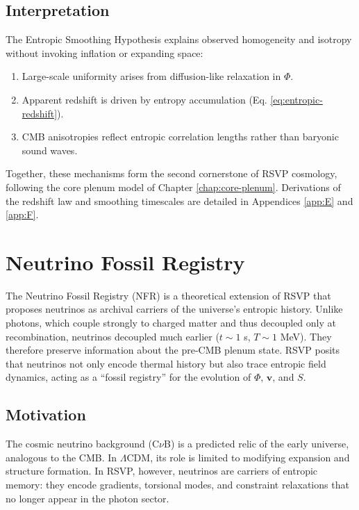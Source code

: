\documentclass[12pt]{report}
\begin{document}
\section{Interpretation}
The Entropic Smoothing Hypothesis explains observed homogeneity and isotropy without invoking inflation or expanding space:
\begin{enumerate}
    \item Large-scale uniformity arises from diffusion-like relaxation in \(\Phi\).
    \item Apparent redshift is driven by entropy accumulation (Eq. \eqref{eq:entropic-redshift}).
    \item CMB anisotropies reflect entropic correlation lengths rather than baryonic sound waves.
\end{enumerate}
Together, these mechanisms form the second cornerstone of RSVP cosmology, following the core plenum model of Chapter \ref{chap:core-plenum}. Derivations of the redshift law and smoothing timescales are detailed in Appendices \ref{app:E} and \ref{app:F}.

\chapter{Neutrino Fossil Registry}
\label{chap:neutrino-fossil}
The Neutrino Fossil Registry (NFR) is a theoretical extension of RSVP that proposes neutrinos as archival carriers of the universe’s entropic history. Unlike photons, which couple strongly to charged matter and thus decoupled only at recombination, neutrinos decoupled much earlier (\(t \sim 1\) s, \(T \sim 1\) MeV). They therefore preserve information about the pre-CMB plenum state. RSVP posits that neutrinos not only encode thermal history but also trace entropic field dynamics, acting as a “fossil registry” for the evolution of \(\Phi\), \(\mathbf{v}\), and \(S\).

\section{Motivation}
The cosmic neutrino background (C\(\nu\)B) is a predicted relic of the early universe, analogous to the CMB. In \(\Lambda\)CDM, its role is limited to modifying expansion and structure formation. In RSVP, however, neutrinos are carriers of entropic memory: they encode gradients, torsional modes, and constraint relaxations that no longer appear in the photon sector.
\end{document}

